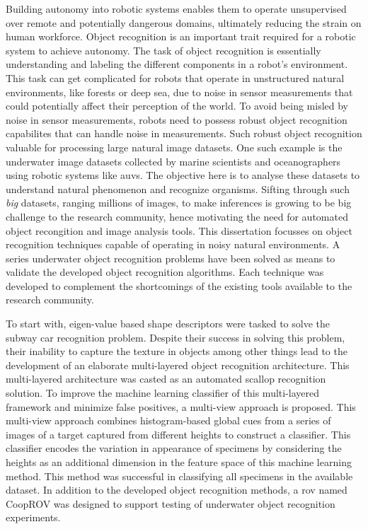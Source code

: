 Building autonomy into robotic systems enables them to operate 
unsupervised over remote and potentially dangerous domains, ultimately reducing the strain on human workforce.
Object recognition is an important trait required for a robotic system to achieve autonomy.
The task of object recognition is essentially understanding and labeling the different components in a robot's environment. This task can get complicated for robots that operate in unstructured natural environments, like forests or deep sea, due to noise in sensor measurements that could potentially affect their perception of the world. To avoid being misled by noise in sensor measurements, robots need to possess robust object recognition capabilites that can handle noise in measurements. Such robust object recognition valuable for processing large natural image datasets. One such example is the underwater image datasets collected by marine scientists and oceanographers using robotic systems like \gls{auv}s. The objective here is to analyse these datasets to understand natural phenomenon and  recognize organisms. Sifting through such \emph{big} datasets, ranging millions of images, to make inferences is growing to be big challenge to the research community, hence motivating the need for automated object recongition and image analysis tools.
This dissertation focusses on object recognition techniques capable of operating in noisy natural environments.
A series underwater object recognition  problems have been solved as means to validate the developed object recognition algorithms. 
Each technique was developed to complement the shortcomings of the existing tools available to the research community. 

To start with, eigen-value based shape descriptors were tasked to solve the subway car recognition problem. Despite their success in solving this problem, their inability to capture the texture in objects among other things lead to the development of an elaborate multi-layered object recognition architecture. This multi-layered architecture was casted as an automated scallop recognition solution. To improve the machine learning classifier of this multi-layered framework and minimize false positives, a multi-view approach is proposed. This multi-view approach combines histogram-based global cues from a series of images of a target captured from different heights to construct a classifier. This classifier encodes the variation in appearance of specimens by considering the heights as an additional dimension in the feature space of this machine learning method. This method was successful in classifying all specimens in the available dataset. In addition to the developed object recognition methods, a \gls{rov} named CoopROV was designed to support testing of underwater object recognition experiments.

